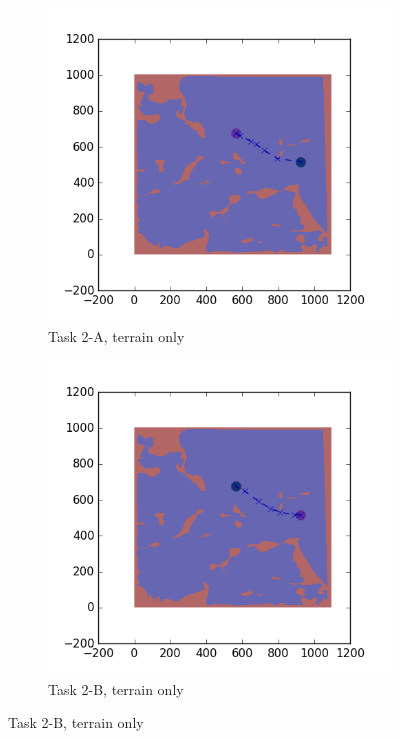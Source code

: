 \documentclass{tamuccthesis}
\begin{document}
\begin{figure}
    \centering
    \begin{subfigure}[b]{0.4\textwidth}
        \centering
        \includegraphics[width=\textwidth,trim={4cm 3cm 2cm 3cm},clip]{EXP3RG_PathBa_-1_-1_0_0.png}
        \caption{Task 2-A, terrain only}
        \label{fig:Path_2-A_terrain}
    \end{subfigure}
    \hfill
    \begin{subfigure}[b]{0.4\textwidth}  
        \centering 
        \includegraphics[width=\textwidth,trim={4cm 3cm 2cm 3cm},clip]{EXP3RG_PathBb_-1_-1_0_0.png}
        \caption{Task 2-B, terrain only}  
        \label{fig:Path_2-B_terrain}
    \end{subfigure}
    

\end{figure}
\end{document}
